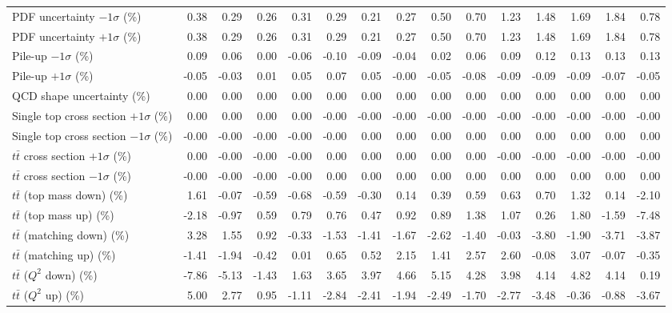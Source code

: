 \begin{table}[htbp]
{\begin{tabular}{lrrrrrrrrrrrrrr}
PDF uncertainty $-1\sigma$ (\%) & 0.38 & 0.29 & 0.26 & 0.31 & 0.29 & 0.21 & 0.27 & 0.50 & 0.70 & 1.23 & 1.48 & 1.69 & 1.84 & 0.78 \\ 
PDF uncertainty $+1\sigma$ (\%) & 0.38 & 0.29 & 0.26 & 0.31 & 0.29 & 0.21 & 0.27 & 0.50 & 0.70 & 1.23 & 1.48 & 1.69 & 1.84 & 0.78 \\ 
Pile-up $-1\sigma$ (\%) & 0.09 & 0.06 & 0.00 & -0.06 & -0.10 & -0.09 & -0.04 & 0.02 & 0.06 & 0.09 & 0.12 & 0.13 & 0.13 & 0.13 \\ 
Pile-up $+1\sigma$ (\%) & -0.05 & -0.03 & 0.01 & 0.05 & 0.07 & 0.05 & -0.00 & -0.05 & -0.08 & -0.09 & -0.09 & -0.09 & -0.07 & -0.05 \\ 
QCD shape uncertainty (\%) & 0.00 & 0.00 & 0.00 & 0.00 & 0.00 & 0.00 & 0.00 & 0.00 & 0.00 & 0.00 & 0.00 & 0.00 & 0.00 & 0.00 \\ 
Single top cross section $+1\sigma$ (\%) & 0.00 & 0.00 & 0.00 & 0.00 & -0.00 & -0.00 & -0.00 & -0.00 & -0.00 & -0.00 & -0.00 & -0.00 & -0.00 & -0.00 \\ 
Single top cross section $-1\sigma$ (\%) & -0.00 & -0.00 & -0.00 & -0.00 & -0.00 & 0.00 & 0.00 & 0.00 & 0.00 & 0.00 & 0.00 & 0.00 & 0.00 & 0.00 \\ 
$t\bar{t}$ cross section $+1\sigma$ (\%) & 0.00 & -0.00 & -0.00 & -0.00 & 0.00 & 0.00 & 0.00 & 0.00 & 0.00 & -0.00 & -0.00 & -0.00 & -0.00 & -0.00 \\ 
$t\bar{t}$ cross section $-1\sigma$ (\%) & -0.00 & -0.00 & -0.00 & -0.00 & 0.00 & 0.00 & 0.00 & 0.00 & 0.00 & 0.00 & 0.00 & 0.00 & 0.00 & 0.00 \\ 
$t\bar{t}$ (top mass down) (\%) & 1.61 & -0.07 & -0.59 & -0.68 & -0.59 & -0.30 & 0.14 & 0.39 & 0.59 & 0.63 & 0.70 & 1.32 & 0.14 & -2.10 \\ 
$t\bar{t}$ (top mass up) (\%) & -2.18 & -0.97 & 0.59 & 0.79 & 0.76 & 0.47 & 0.92 & 0.89 & 1.38 & 1.07 & 0.26 & 1.80 & -1.59 & -7.48 \\ 
$t\bar{t}$ (matching down) (\%) & 3.28 & 1.55 & 0.92 & -0.33 & -1.53 & -1.41 & -1.67 & -2.62 & -1.40 & -0.03 & -3.80 & -1.90 & -3.71 & -3.87 \\ 
$t\bar{t}$ (matching up) (\%) & -1.41 & -1.94 & -0.42 & 0.01 & 0.65 & 0.52 & 2.15 & 1.41 & 2.57 & 2.60 & -0.08 & 3.07 & -0.07 & -0.35 \\ 
$t\bar{t}$ ($Q^{2}$ down) (\%) & -7.86 & -5.13 & -1.43 & 1.63 & 3.65 & 3.97 & 4.66 & 5.15 & 4.28 & 3.98 & 4.14 & 4.82 & 4.14 & 0.19 \\ 
$t\bar{t}$ ($Q^{2}$ up) (\%) & 5.00 & 2.77 & 0.95 & -1.11 & -2.84 & -2.41 & -1.94 & -2.49 & -1.70 & -2.77 & -3.48 & -0.36 & -0.88 & -3.67 \\ 

\end{tabular}}
\end{table}
